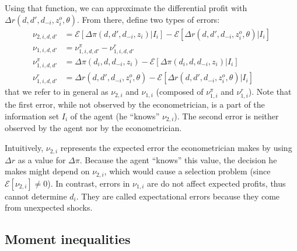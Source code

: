 Using that function, we can approximate the differential profit with $\Delta r(d, d', d_{-i}, z_i^o, \theta)$. From there, define two types of errors: \begin{align*}
\nu_{2, i, d, d'} & = \mathcal{E}\left[ \Delta\pi(d, d', d_{-i}, z_i) | I_i \right] - \mathcal{E}\left[ \Delta r(d, d', d_{-i}, z_i^o, \theta) | I_i \right] \\ \nu_{1, i, d, d'} & = \nu_{1, i, d, d'}^\pi - \nu_{1, i, d, d'}^r \\ \nu_{1, i, d, d'}^\pi & = \Delta\pi(d_i, d, d_{-i}, z_i) - \mathcal{E}\left[ \Delta\pi(d_i, d, d_{-i}, z_i) | I_i \right] \\ \nu_{1, i, d, d'}^r & = \Delta r(d, d', d_{-i}, z_i^o, \theta) - \mathcal{E}\left[\Delta r(d, d', d_{-i}, z_i^o, \theta)|I_i\right]
\end{align*}
that we refer to in general as $\nu_{2,i}$ and $\nu_{1,i}$ (composed of $\nu_{1,i}^\pi$ and $\nu_{1,i}^r$). Note that the first error, while not observed by the econometrician, is a part of the information set $I_i$ of the agent (he ``knows'' $\nu_{2,i}$). The second error is neither observed by the agent nor by the econometrician.

Intuitively, $\nu_{2,i}$ represents the expected error the econometrician makes by using $\Delta r$ as a value for $\Delta \pi$. Because the agent ``knows'' this value, the decision he makes might depend on $\nu_{2,i}$, which would cause a selection problem (since $ \mathcal{E}\left[\nu_{2,i}\right]\neq 0$). In contrast, errors in $\nu_{1,i}$ are do not affect expected profits, thus cannot determine $d_i$. They are called expectational errors because they come from unexpected shocks.

\subsection{Moment inequalities}




